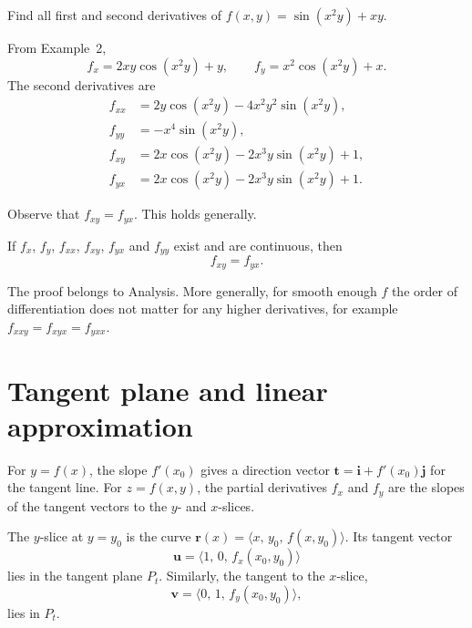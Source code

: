 \begin{example}
Find all first and second derivatives of $f(x,y)=\sin(x^2y)+xy$.

From Example~2,
\[
 f_x=2xy\cos(x^2y)+y,\qquad f_y=x^2\cos(x^2y)+x.
\]
The second derivatives are
\begin{align*}
 f_{xx}&=2y\cos(x^2y)-4x^2y^2\sin(x^2y),\\
 f_{yy}&=-x^4\sin(x^2y),\\
 f_{xy}&=2x\cos(x^2y)-2x^3y\sin(x^2y)+1,\\
 f_{yx}&=2x\cos(x^2y)-2x^3y\sin(x^2y)+1.
\end{align*}
\end{example}

Observe that $f_{xy}=f_{yx}$. This holds generally.

\begin{theorem}
If $f_x$, $f_y$, $f_{xx}$, $f_{xy}$, $f_{yx}$ and $f_{yy}$ exist and are
continuous, then
\[
 f_{xy}=f_{yx}.
\]
\end{theorem}
The proof belongs to Analysis. More generally, for smooth enough $f$ the
order of differentiation does not matter for any higher derivatives, for example
$f_{xxy}=f_{xyx}=f_{yxx}$.

\section{Tangent plane and linear approximation}

For $y=f(x)$, the slope $f'(x_0)$ gives a direction vector
$\mathbf t=\mathbf i+f'(x_0)\mathbf j$ for the tangent line.
For $z=f(x,y)$, the partial derivatives $f_x$ and $f_y$ are the slopes of the
tangent vectors to the $y$- and $x$-slices.

The $y$-slice at $y=y_0$ is the curve $\mathbf r(x)=\langle x,\,y_0,\,f(x,y_0)\rangle$.
Its tangent vector
\[
 \mathbf u=\langle1,\,0,\,f_x(x_0,y_0)\rangle
\]
lies in the tangent plane $P_t$. Similarly, the tangent to the $x$-slice,
\[
 \mathbf v=\langle0,\,1,\,f_y(x_0,y_0)\rangle,
\]
lies in $P_t$.

\begin{center}
\end{center}

